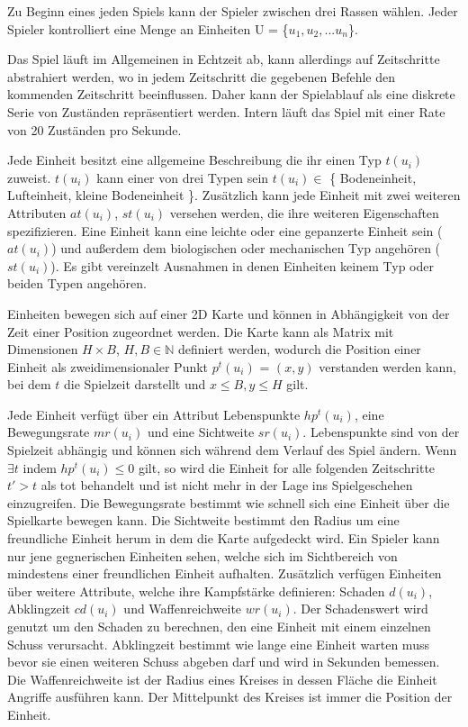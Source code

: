 Zu Beginn eines jeden Spiels kann der Spieler zwischen drei Rassen wählen. Jeder Spieler kontrolliert eine Menge an Einheiten U = \{$u_1, u_2, ... u_n$\}.

Das Spiel läuft im Allgemeinen in Echtzeit ab, kann allerdings auf Zeitschritte abstrahiert werden, wo in jedem Zeitschritt die gegebenen Befehle den kommenden Zeitschritt beeinflussen. Daher kann der Spielablauf als eine diskrete Serie von Zuständen repräsentiert werden. Intern läuft das Spiel mit einer Rate von 20 Zuständen pro Sekunde. 


Jede Einheit besitzt eine allgemeine Beschreibung die ihr einen Typ $t(u_i)$ zuweist. $t(u_i)$ kann einer von drei Typen sein $t(u_i) \in$ \{ Bodeneinheit, Lufteinheit, kleine Bodeneinheit \}. Zusätzlich kann jede Einheit mit zwei weiteren Attributen $at(u_i)$, $st(u_i)$ versehen werden, die ihre weiteren Eigenschaften spezifizieren. Eine Einheit kann eine leichte oder eine gepanzerte Einheit sein ($at(u_i)$) und außerdem dem biologischen oder mechanischen Typ angehören ($st(u_i)$). Es gibt vereinzelt Ausnahmen in denen Einheiten keinem Typ oder beiden Typen angehören.

Einheiten bewegen sich auf einer 2D Karte und können in Abhängigkeit von der Zeit einer Position zugeordnet werden. Die Karte kann als Matrix mit Dimensionen $H \times B$, $H,B \in \mathbb{N}$ definiert werden, wodurch die Position einer Einheit als zweidimensionaler Punkt $p^t(u_i)$ = $(x,y)$ verstanden werden kann, bei dem $t$ die Spielzeit darstellt und $x \leq B, y \leq H$ gilt.

Jede Einheit verfügt über ein Attribut Lebenspunkte $hp^t(u_i)$, eine Bewegungsrate $mr(u_i)$ und eine Sichtweite $sr(u_i)$. Lebenspunkte sind von der Spielzeit abhängig und können sich während dem Verlauf des Spiel ändern. Wenn $\exists t$ indem $hp^t(u_i) \leq 0$ gilt, so wird die Einheit for alle folgenden Zeitschritte $t' > t$ als tot behandelt und ist nicht mehr in der Lage ins Spielgeschehen einzugreifen. Die Bewegungsrate bestimmt wie schnell sich eine Einheit über die Spielkarte bewegen kann. Die Sichtweite bestimmt den Radius um eine freundliche Einheit herum in dem die Karte aufgedeckt wird. Ein Spieler kann nur jene gegnerischen Einheiten sehen, welche sich im Sichtbereich von mindestens einer freundlichen Einheit aufhalten. Zusätzlich verfügen Einheiten über weitere Attribute, welche ihre Kampfstärke definieren: Schaden $d(u_i)$, Abklingzeit $cd(u_i)$ und Waffenreichweite $wr(u_i)$. Der Schadenswert wird genutzt um den Schaden zu berechnen, den eine Einheit mit einem einzelnen Schuss verursacht. Abklingzeit bestimmt wie lange eine Einheit warten muss bevor sie einen weiteren Schuss abgeben darf und wird in Sekunden bemessen. Die Waffenreichweite ist der Radius eines Kreises in dessen Fläche die Einheit Angriffe ausführen kann. Der Mittelpunkt des Kreises ist immer die Position der Einheit. 

